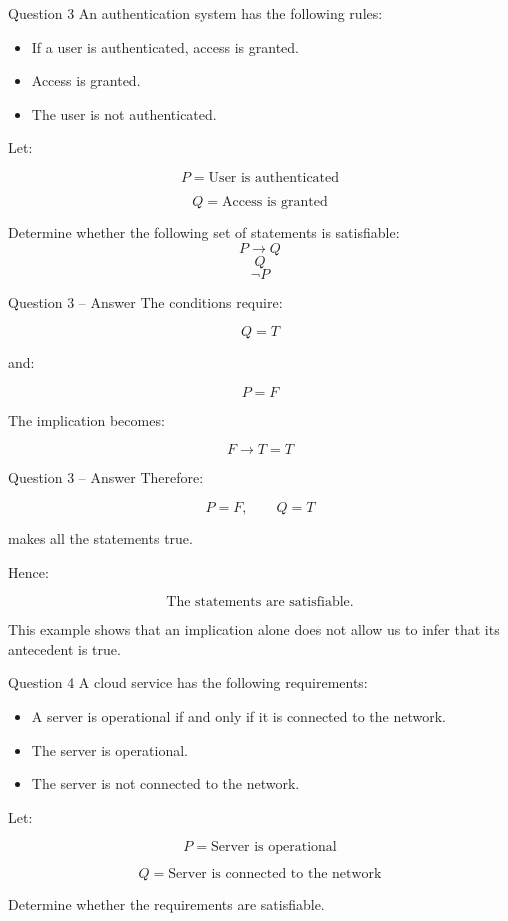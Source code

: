 \begin{frame}{Question 3}
An authentication system has the following rules:

\begin{itemize}
\item If a user is authenticated, access is granted.
\item Access is granted.
\item The user is not authenticated.
\end{itemize}

Let:

$$
P = \text{User is authenticated}
$$

$$
Q = \text{Access is granted}
$$

Determine whether the following set of statements is satisfiable:
$$
P\rightarrow Q
$$
$$
Q
$$
$$
\neg P
$$

\end{frame}

\begin{frame}{Question 3 -- Answer}
The conditions require:

$$
Q=T
$$

and:

$$
P=F
$$

The implication becomes:

$$
F\rightarrow T=T
$$

\end{frame}

\begin{frame}{Question 3 -- Answer}
Therefore:

$$
P=F,\qquad Q=T
$$

makes all the statements true.

Hence:

$$
\boxed{\text{The statements are satisfiable.}}
$$

This example shows that an implication alone does not allow us to infer
that its antecedent is true.
\end{frame}


\begin{frame}{Question 4}
A cloud service has the following requirements:

\begin{itemize}
\item A server is operational if and only if it is connected to the
network.
\item The server is operational.
\item The server is not connected to the network.
\end{itemize}

Let:

$$
P = \text{Server is operational}
$$

$$
Q = \text{Server is connected to the network}
$$

Determine whether the requirements are satisfiable.
\end{frame}

